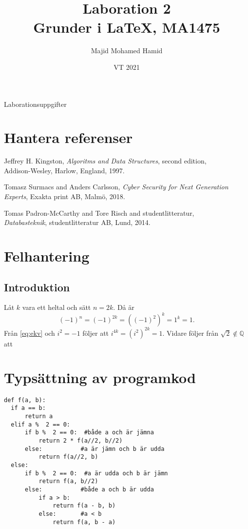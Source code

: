 \documentclass[a4paper, titlepage]{article}
\title{Laboration 2\\Grunder i \LaTeX, MA1475}%
\author{Majid Mohamed Hamid}
\date{VT 2021}
\begin{document}
\maketitle
\begin{center} 
Laborationsuppgifter 
\end{center}

\section{Hantera referenser}
\begin{thebibliography}{0}
 Jeffrey H. Kingston, \emph{Algoritms and Data Structures}, second edition,\\ Addison-Wesley, Harlow, England, 1997.

 Tomasz Surmacs and Anders Carlsson, \emph{Cyber Security for Next Generation\\Experts}, Exakta print AB, Malmö, 2018.

 Tomas Padron-McCarthy and Tore Risch and studentlitteratur, \\\emph{Databasteknik}, studentlitteratur AB, Lund, 2014. 
\end{thebibliography}

\section{Felhantering}
\subsection*{Introduktion}
Låt $k$ vara ett heltal och sätt $n = 2k$. Då är
\begin{equation}\label{eq:ekv}
(-1)^n = (-1)^{2k} = ((-1)^2)^k = 1^k = 1.
\end{equation}
Från \ref{eq:ekv} och $i^2 = -1$ följer att $i^{4k} = (i^2)^{2k} = 1.$ 
Vidare följer från $\sqrt{2} \notin \mathbb{Q}$ att


\section{Typsättning av programkod}
\begin{verbatim}
def f(a, b):
  if a == b:
      return a
  elif a %  2 == 0:
      if b %  2 == 0:  #både a och är jämna
          return 2 * f(a//2, b//2)
      else:           #a är jämn och b är udda
          return f(a//2, b)
  else:
      if b %  2 == 0:  #a är udda och b är jämn
          return f(a, b//2)
      else:           #både a och b är udda
          if a > b:
              return f(a - b, b)
          else:       #a < b
              return f(a, b - a)
\end{verbatim}                
\end{document}
